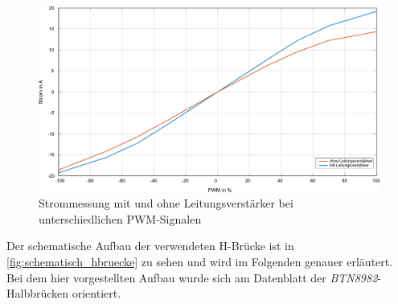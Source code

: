 \begin{figure} [H]
	\centering
	\includegraphics[width=0.8\linewidth]{Bilder/Strommessung.pdf}
	\caption{Strommessung mit und ohne Leitungsverstärker bei unterschiedlichen PWM-Signalen}
	\label{fig:Strommessung}
\end{figure}\noindent
Der schematische Aufbau der verwendeten H-Brücke ist in \autoref{fig:schematisch_hbruecke} zu sehen und wird im Folgenden genauer erläutert. Bei dem hier vorgestellten Aufbau wurde sich am Datenblatt der \textit{BTN8982}-Halbbrücken orientiert.

